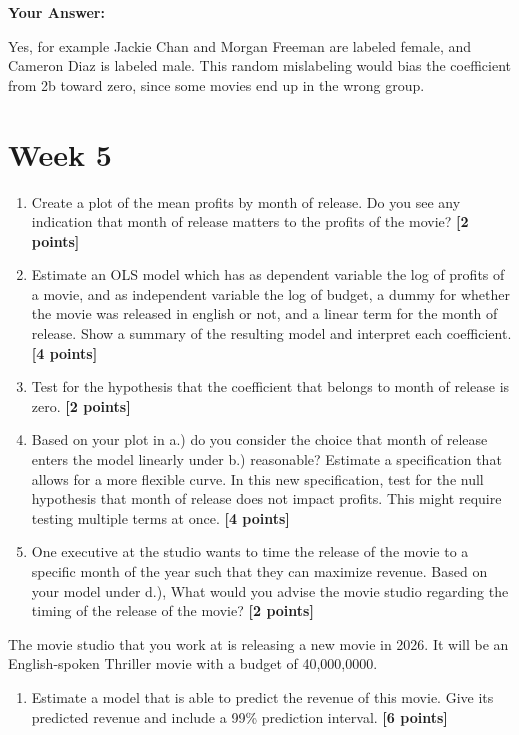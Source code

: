 \documentclass[
]{article}
\providecommand{\tightlist}{%
  \setlength{\itemsep}{0pt}\setlength{\parskip}{0pt}}
\begin{document}
\textbf{Your Answer:}

Yes, for example Jackie Chan and Morgan Freeman are labeled female, and
Cameron Diaz is labeled male. This random mislabeling would bias the
coefficient from 2b toward zero, since some movies end up in the wrong
group.

\section{Week 5}\label{week-5}

\begin{enumerate}
\def\labelenumi{\alph{enumi}.}
\item
  Create a plot of the mean profits by month of release. Do you see any
  indication that month of release matters to the profits of the movie?
  \textbf{[2 points]}
\item
  Estimate an OLS model which has as dependent variable the log of
  profits of a movie, and as independent variable the log of budget, a
  dummy for whether the movie was released in english or not, and a
  linear term for the month of release. Show a summary of the resulting
  model and interpret each coefficient. \textbf{[4 points]}
\item
  Test for the hypothesis that the coefficient that belongs to month of
  release is zero. \textbf{[2 points]}
\item
  Based on your plot in a.) do you consider the choice that month of
  release enters the model linearly under b.) reasonable? Estimate a
  specification that allows for a more flexible curve. In this new
  specification, test for the null hypothesis that month of release does
  not impact profits. This might require testing multiple terms at once.
  \textbf{[4 points]}
\item
  One executive at the studio wants to time the release of the movie to
  a specific month of the year such that they can maximize revenue.
  Based on your model under d.), What would you advise the movie studio
  regarding the timing of the release of the movie? \textbf{[2 points]}
\end{enumerate}

The movie studio that you work at is releasing a new movie in 2026. It
will be an English-spoken Thriller movie with a budget of 40,000,0000.

\begin{enumerate}
\def\labelenumi{\alph{enumi}.}
\setcounter{enumi}{5}
\tightlist
\item
  Estimate a model that is able to predict the revenue of this movie.
  Give its predicted revenue and include a 99\% prediction interval.
  \textbf{[6 points]}
\end{enumerate}
\end{document}
